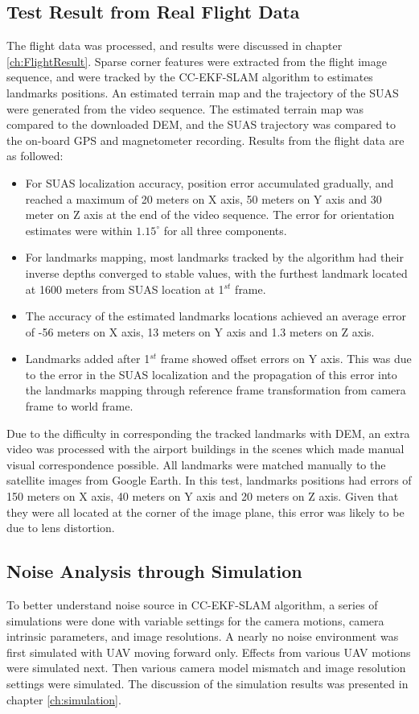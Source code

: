 \subsection{Test Result from Real Flight Data}
The flight data was processed, and results were discussed in chapter
\ref{ch:FlightResult}. Sparse corner features were extracted from the
flight image sequence, and were tracked by the CC-EKF-SLAM algorithm
to estimates landmarks positions. An estimated terrain map and the
trajectory of the SUAS were generated from the video sequence. The
estimated terrain map was compared to the downloaded DEM, and the SUAS
trajectory was compared to the on-board GPS and magnetometer
recording. Results from the flight data are as followed:
\begin{itemize}
  \item For SUAS localization accuracy, position error accumulated
  gradually, and reached a maximum of 20 meters on X axis, 50 meters
  on Y axis and 30 meter on Z axis at the end of the video sequence.
  The error for orientation estimates were within $1.15^\circ$ for all
  three components.
  \item For landmarks mapping,  most landmarks tracked by the
  algorithm had their inverse depths converged to stable values, with the
  furthest landmark located at 1600 meters from SUAS location at
  1$^{st}$ frame.
  \item The accuracy of the estimated landmarks locations achieved an
  average error of -56 meters on X axis, 13 meters on Y axis and 1.3
  meters on Z axis.
  \item Landmarks added after 1$^{st}$ frame showed offset errors on Y
  axis. This was due to the error in the SUAS localization and the
  propagation of this error into the landmarks mapping through
  reference frame transformation from camera frame to world frame.
\end{itemize}

Due to the difficulty in corresponding the tracked landmarks with DEM,
an extra video was processed with the airport buildings in the scenes
which made manual visual correspondence possible. All landmarks
were matched manually to the satellite images from Google Earth. In
this test, landmarks positions had errors of 150 meters on X axis, 40
meters on Y axis and 20
meters on Z axis. Given that they were all located at the corner
of the image plane, this error was likely to be due to lens
distortion.

\subsection{Noise Analysis through Simulation}
To better understand noise source in CC-EKF-SLAM algorithm, a series
of simulations were done with variable settings for the camera
motions, camera intrinsic parameters, and image resolutions. A nearly
no noise environment was first simulated with UAV moving forward only.
Effects from various UAV motions were simulated next. Then
various camera model mismatch and image resolution settings were
simulated. The discussion of the simulation results was presented in
chapter \ref{ch:simulation}.


